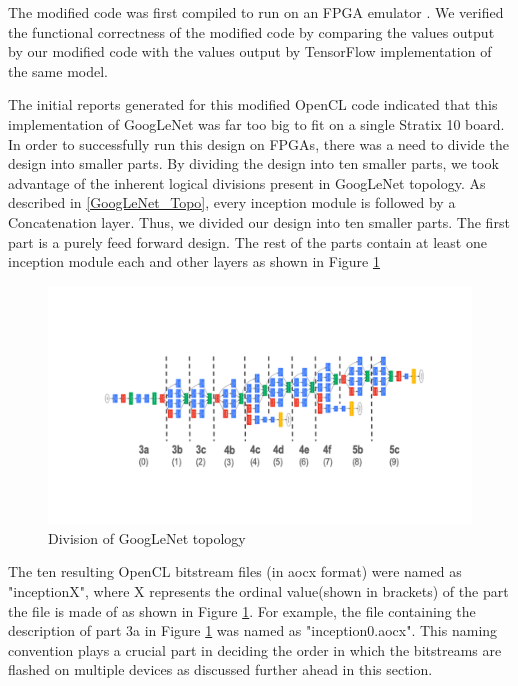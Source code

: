 The modified code was first compiled to run on an FPGA emulator . We verified the functional correctness of the modified code by comparing the values output by our modified code with the values output by TensorFlow implementation of the same model.  

The initial reports generated for this modified OpenCL code indicated that this implementation of GoogLeNet was far too big to fit on a single Stratix 10 board. In order to successfully run this design on FPGAs, there was a need to divide the design into smaller parts. By dividing the design into ten smaller parts, we took advantage of the inherent logical divisions present in GoogLeNet topology. As  described in \ref{GoogLeNet_Topo}, every inception module is followed by a  Concatenation layer. Thus, we divided our design into ten smaller parts.  The first part is a purely feed forward design. The rest of the parts contain at least one inception module each and other layers as shown in Figure \ref{fig:GoogLeNet_division}


\begin{figure}[h!]
  \includegraphics[width=\textwidth,height=\textheight,keepaspectratio]{img/GoogLeNet_division.png}
  \caption{Division of GoogLeNet topology}
  \label{fig:GoogLeNet_division}
\end{figure}
 
The ten resulting OpenCL bitstream files (in aocx format) were named as "inceptionX", where X represents the ordinal value(shown in brackets) of the part the file is made of as shown in Figure \ref{fig:GoogLeNet_division}. For example, the file containing the description of part 3a in Figure \ref{fig:GoogLeNet_division} was named as "inception0.aocx". This naming convention plays a crucial part in deciding the order in which the bitstreams are flashed on multiple devices as discussed further ahead in this section.  

